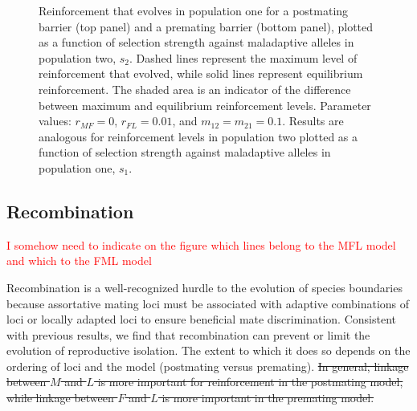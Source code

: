 \documentclass[11pt]{article}
\begin{document}
\begin{figure}
[!htb]
\centering
{}
\caption{
\linespread{1.618}\selectfont
Reinforcement that evolves in population one for a postmating barrier (top panel) and a premating barrier (bottom panel), plotted as a function of selection strength against maladaptive alleles in population two, $s_{2}$. Dashed lines represent the maximum level of reinforcement that evolved, while solid lines represent equilibrium reinforcement.  The shaded area is an indicator of the difference between maximum and equilibrium reinforcement levels. Parameter values: $r_{MF} = 0$, $r_{FL} = 0.01$, and $m_{12} = m_{21} = 0.1$. Results are analogous for reinforcement levels in population two plotted as a function of selection strength against maladaptive alleles in population one, $s_1$.}
\label{fig:selection}
\end{figure}

\FloatBarrier

\subsection*{Recombination}\label{section:recomb}
\textcolor{red}{I somehow need to indicate on the figure which lines belong to the MFL model and which to the FML model}

Recombination is a well-recognized hurdle to the evolution of species boundaries because assortative mating loci must be associated with adaptive combinations of loci or locally adapted loci to ensure beneficial mate discrimination. Consistent with previous results, we find that recombination can prevent or limit the evolution of reproductive isolation. The extent to which it does so depends on the ordering of loci and the model (postmating versus premating).  \sout{In general, linkage between $M$ and $L$ is more important for reinforcement in the postmating model, while linkage between $F$ and $L$ is more important in the premating model.  }
\end{document}
